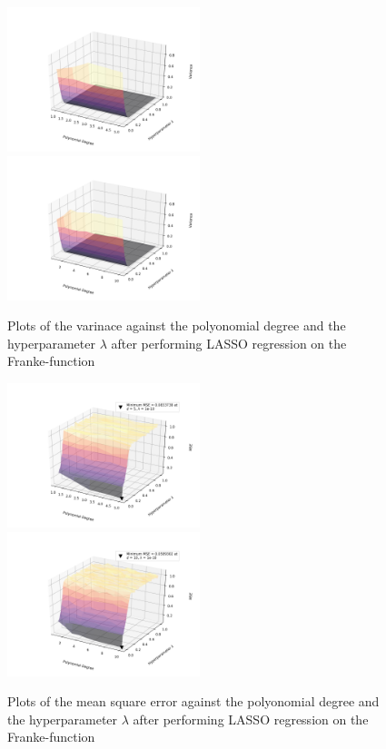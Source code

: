 \documentclass[a4paper,10pt,english]{article}
\begin{document}

\begin{figure}[H]
	\centering 
	\includegraphics[width = 0.5\textwidth, center]{../franke_output/part_E_1.png}
	\includegraphics[width = 0.5\textwidth, center]{../franke_output/part_E_1_highdeg.png}
	\caption{
		Plots of the varinace against the polyonomial degree and the hyperparameter $\lambda$ after performing LASSO regression on the Franke-function
	}
	\label{part_e1}
\end{figure}

\begin{figure}[H]
	\centering 
	\includegraphics[width = 0.5\textwidth, center]{../franke_output/part_E_2.png}
	\includegraphics[width = 0.5\textwidth, center]{../franke_output/part_E_2_highdeg.png}
	\caption{
		Plots of the mean square error against the polyonomial degree and the hyperparameter $\lambda$ after performing LASSO regression on the Franke-function 
	}
	\label{part_e2}
\end{figure}
\end{document}
